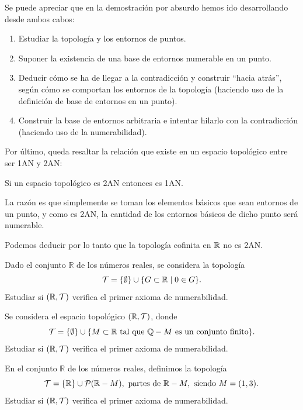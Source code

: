 Se puede apreciar que en la demostración por absurdo hemos ido desarrollando desde ambos cabos:
\begin{enumerate}
    \item Estudiar la topología y los entornos de puntos.
    \item Suponer la existencia de una base de entornos numerable en un punto.
    \item Deducir cómo se ha de llegar a la contradicción y construir ``hacia atrás'', según cómo se comportan los entornos de la topología (haciendo uso de la definición de base de entornos en un punto).
    \item Construir la base de entornos arbitraria e intentar hilarlo con la contradicción (haciendo uso de la numerabilidad).
\end{enumerate}

Por último, queda resaltar la relación que existe en un espacio topológico entre ser 1AN y 2AN:
\begin{prop}
    Si un espacio topológico es 2AN entonces es 1AN.

    La razón es que simplemente se toman los elementos básicos que sean entornos de un punto, y como es 2AN, la cantidad de los entornos básicos de dicho punto será numerable.
\end{prop}

Podemos deducir por lo tanto que la topología cofinita en $\mathbb{R}$ no es 2AN. 

{}

\begin{ex}
    Dado el conjunto \(\mathbb{R}\) de los números reales, se considera la topología 
    \[
        \mathcal{T} = \{\emptyset\} \cup \{G \subset \mathbb{R} \mid 0 \in G\}.
    \]
    Estudiar si \((\mathbb{R},\mathcal{T})\) verifica el primer axioma de numerabilidad.
\end{ex}

\begin{ex}
    Se considera el espacio topológico \((\mathbb{R}, \mathcal{T})\), donde
    \[
        \mathcal{T} = \{\emptyset\} \cup \{M \subset \mathbb{R} \text{ tal que } \mathbb{Q} - M \text{ es un conjunto finito}\}.
    \]
    Estudiar si \((\mathbb{R}, \mathcal{T})\) verifica el primer axioma de numerabilidad.
\end{ex}

\begin{ex}
    En el conjunto \(\mathbb{R}\) de los números reales, definimos la topología
    \[
        \mathcal{T} = \{\mathbb{R}\} \cup \mathcal{P}(\mathbb{R} - M), \text{ partes de } \mathbb{R} - M, \text{ siendo } M = (1,3).
    \]
    Estudiar si \((\mathbb{R},\mathcal{T})\) verifica el primer axioma de numerabilidad.
\end{ex}




